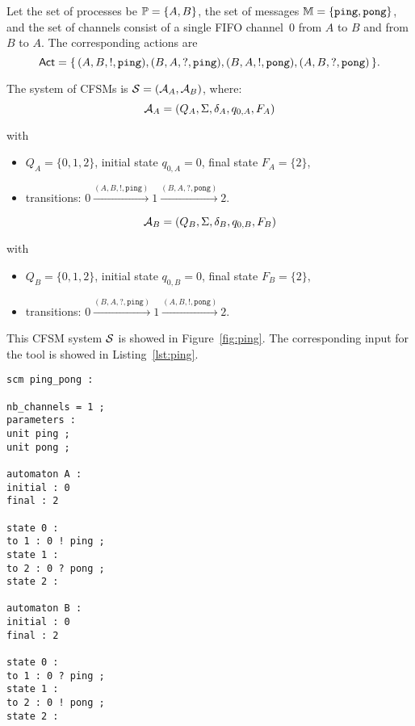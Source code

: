 \begin{example}\label{exm:ping}

Let the set of processes be $\mathbb{P} = \{A,B\}$,
the set of messages $\mathbb{M} = \{\texttt{ping},\texttt{pong}\}$,
and the set of channels consist of a single FIFO channel~0 from 
$A$ to $B$ and from $B$ to $A$. The corresponding actions are
$$
\mathsf{Act} = \{\, (A,B,!,\texttt{ping}), (B,A,?,\texttt{ping}), 
(B,A,!,\texttt{pong}), (A,B,?,\texttt{pong}) \,\}.
$$

The system of CFSMs is $\mathcal{S} = (\mathcal{A}_A, \mathcal{A}_B)$, where:
$$
\mathcal{A}_A = (Q_A, \Sigma, \delta_A, q_{0,A}, F_A)
$$

with
\begin{itemize}
\item $Q_A = \{0,1,2\}$, initial state $q_{0,A} = 0$, final state $F_A = \{2\}$,
\item transitions: $0 \xrightarrow{(A,B,!,\texttt{ping})} 1 \xrightarrow{(B,A,?,\texttt{pong})} 2$.
\end{itemize}

$$
\mathcal{A}_B = (Q_B, \Sigma, \delta_B, q_{0,B}, F_B)
$$

with
\begin{itemize}
\item $Q_B = \{0,1,2\}$, initial state $q_{0,B} = 0$, final state $F_B = \{2\}$,
\item transitions: $0 \xrightarrow{(B,A,?,\texttt{ping})} 1 \xrightarrow{(A,B,!,\texttt{pong})} 2$.
\end{itemize}

This CFSM system $\mathcal{S}$ is showed in Figure~\ref{fig:ping}. The corresponding
input for the tool is showed in Listing~\ref{lst:ping}.

\bigskip

\begin{lstlisting}[language={},caption={Tool's input for Example~\ref{exm:ping}},label={lst:ping}]
scm ping_pong :

nb_channels = 1 ;
parameters :
unit ping ;
unit pong ;

automaton A :
initial : 0
final : 2

state 0 :
to 1 : 0 ! ping ;
state 1 :
to 2 : 0 ? pong ;
state 2 :

automaton B :
initial : 0
final : 2

state 0 :
to 1 : 0 ? ping ;
state 1 :
to 2 : 0 ! pong ;
state 2 :
\end{lstlisting}
  

\end{example}
